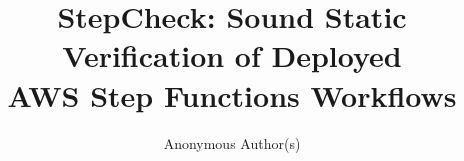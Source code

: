 \documentclass[runningheads]{llncs}
\begin{document}
\title{StepCheck: Sound Static Verification of Deployed\\
AWS Step Functions Workflows}

\author{Anonymous Author(s)}

\maketitle
\raggedbottom

\begin{abstract}

\end{abstract}




\vspace{-0.25cm}

\vspace{-0.25cm}






\end{document}
